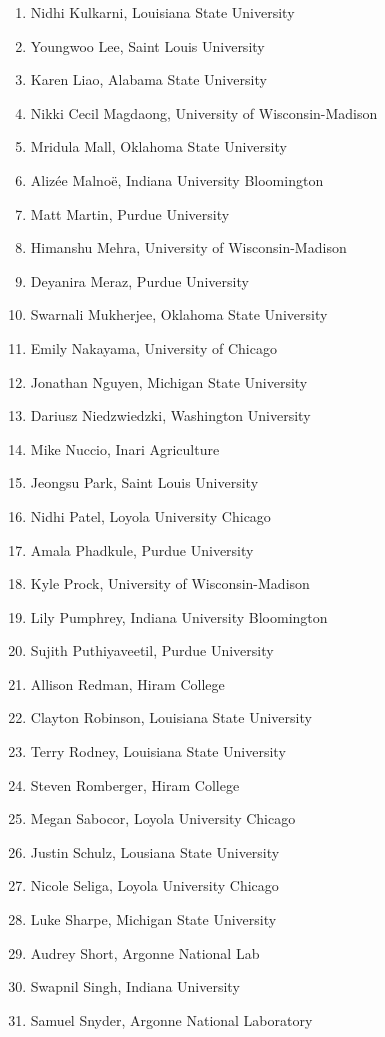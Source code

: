 \begin{multicols}{2}
\begin{enumerate}
\item Nidhi	Kulkarni,	Louisiana State University
\item Youngwoo	Lee,	Saint Louis University
\item Karen	Liao,	Alabama State University
\item Nikki Cecil	Magdaong,	University of Wisconsin-Madison
\item Mridula 	Mall,	Oklahoma State University
\item Alizée	Malnoë,	Indiana University Bloomington
\item Matt	Martin,	Purdue University
\item Himanshu 	Mehra,	University of Wisconsin-Madison
\item Deyanira	Meraz,	Purdue University
\item Swarnali	Mukherjee,	Oklahoma State University
\item Emily	Nakayama,	University of Chicago
\item Jonathan	Nguyen,	Michigan State University
\item Dariusz	Niedzwiedzki,	Washington University
\item Mike	Nuccio,	Inari Agriculture
\item Jeongsu	Park,	Saint Louis University
\item Nidhi	Patel,	Loyola University Chicago
\item Amala 	Phadkule,	Purdue University
\item Kyle	Prock,	University of Wisconsin-Madison
\item Lily	Pumphrey,	Indiana University Bloomington
\item Sujith	Puthiyaveetil,	Purdue University 
\item Allison	Redman,	Hiram College
\item Clayton	Robinson,	Louisiana State University
\item Terry Rodney, Louisiana State University
\item Steven	Romberger,	Hiram College
\item Megan	Sabocor,	Loyola University Chicago
\item Justin	Schulz,	Lousiana State University
\item Nicole	Seliga,	Loyola University Chicago
\item Luke	Sharpe,	Michigan State University
\item Audrey	Short,	Argonne National Lab
\item Swapnil	Singh,	Indiana University
\item Samuel	Snyder,	Argonne National Laboratory

\end{enumerate}
\end{multicols}
